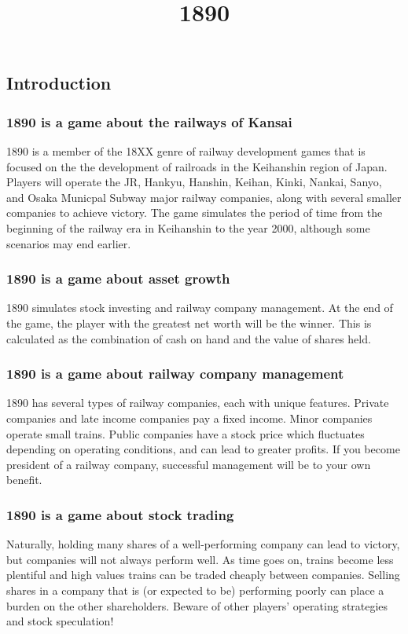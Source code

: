 \documentclass{article}
\title{1890}
\begin{document}
\begin{CJK}{UTF8}{min}
\begin{multicols}{2}
\section*{Introduction}

\subsubsection*{1890 is a game about the railways of Kansai}
1890 is a member of the 18XX genre of railway development games that
is focused on the the development of railroads in the Keihanshin
region of Japan. Players will operate the JR, Hankyu, Hanshin, Keihan,
Kinki, Nankai, Sanyo, and Osaka Municpal Subway major railway
companies, along with several smaller companies to achieve
victory. The game simulates the period of time from the beginning of
the railway era in Keihanshin to the year 2000, although some
scenarios may end earlier.

\subsubsection*{1890 is a game about asset growth}
1890 simulates stock investing and railway company management. At the end
of the game, the player with the greatest net worth will be the
winner. This is calculated as the combination of cash on hand and
the value of shares held.

\subsubsection*{1890 is a game about railway company management}
1890 has several types of railway companies, each with unique
features. Private companies and late income companies pay a fixed
income. Minor companies operate small trains. Public companies have a
stock price which fluctuates depending on operating conditions, and
can lead to greater profits. If you become president of a railway
company, successful management will be to your own benefit.

\subsubsection*{1890 is a game about stock trading}
Naturally, holding many shares of a well-performing company can lead
to victory, but companies will not always perform well. As time goes
on, trains become less plentiful and high values trains can be traded
cheaply between companies. Selling shares in a company that is (or
expected to be) performing poorly can place a burden on the other
shareholders. Beware of other players' operating strategies and stock
speculation!


\end{multicols}
\end{CJK}
\end{document}
